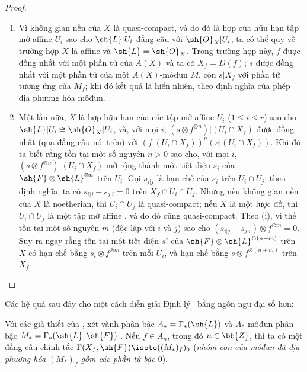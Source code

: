 \documentclass[oneside]{amsart}
\renewcommand{\leq}{\leqslant}
\newcommand{\oldpage}[2][]{{\marginnote{\normalfont\textbf{#1}~|~#2}}\ignorespaces}
\let\EGAOriginalLabel\label
\renewcommand{\label}[1]{\phantomsection\EGAOriginalLabel{#1}}
\begin{document}
\begin{proof}
\medskip\noindent
\begin{enumerate}
  \item[(i)] Vì không gian nền của $X$ là quasi-compact, và do đó là hợp của
    hữu hạn tập mở affine $U_i$ sao cho $\sh{L}|U_i$ đẳng cấu với
    $\sh{O}_X|U_i$, ta có thể quy về trường hợp $X$ là affine và $\sh{L}=\sh{O}_X$.
    Trong trường hợp này, $f$ được đồng nhất với một phần tử của $A(X)$ và ta có
    $X_f=D(f)$; $s$ được đồng nhất với một phần tử của một $A(X)$-môđun $M$, còn
    $s|X_f$ với phần tử tương ứng của $M_f$; khi đó kết quả là hiển nhiên,
    theo định nghĩa của phép địa phương hóa môđun.
\oldpage[I]{173}
  \item[(ii)] Một lần nữa, $X$ là hợp hữu hạn của các tập mở affine $U_i$ ($1\leq i\leq r$)
    sao cho $\sh{L}|U_i\cong\sh{O}_X|U_i$, và, với mọi $i$,
    $(s\otimes f^{\otimes n})|(U_i\cap X_f)$ được đồng nhất (qua đẳng cấu nói trên)
    với $(f|(U_i\cap X_f))^n(s|(U_i\cap X_f))$. Khi đó ta biết
     rằng tồn tại một số nguyên $n>0$ sao cho, với mọi
    $i$, $(s\otimes f^{\otimes n})|(U_i\cap X_f)$ mở rộng thành một tiết diện $s_i$ của
    $\sh{F}\otimes\sh{L}^{\otimes n}$ trên $U_i$. Gọi $s_{i|j}$ là hạn chế
    của $s_i$ trên $U_i\cap U_j$; theo định nghĩa, ta có $s_{i|j}-s_{j|i}=0$ trên
    $X_f\cap U_i\cap U_j$. Nhưng nếu không gian nền của $X$ là noetherian, thì $U_i\cap U_j$ là
    quasi-compact; nếu $X$ là một lược đồ, thì $U_i\cap U_j$ là một tập mở affine
    , và do đó cũng quasi-compact. Theo (i), vì thế
    tồn tại một số nguyên $m$ (độc lập với $i$ và $j$) sao cho
    $(s_{i|j}-s_{j|i})\otimes f^{\otimes m}=0$. Suy ra ngay rằng
    tồn tại một tiết diện $s'$ của $\sh{F}\otimes\sh{L}^{\otimes(n+m)}$ trên $X$ có
    hạn chế bằng $s_i\otimes f^{\otimes m}$ trên mỗi $U_i$, và hạn chế bằng
    $s\otimes f^{\otimes(n+m)}$ trên $X_f$.
\end{enumerate}
\end{proof}

Các hệ quả sau đây cho một cách diễn giải Định lý~ bằng ngôn ngữ
đại số hơn:
\begin{corollary}[9.3.2]
\label{I.9.3.2}
Với các giả thiết của , xét vành phân bậc $A_*=\Gamma_*(\sh{L})$
và $A_*$-môđun phân bậc $M_*=\Gamma_*(\sh{L},\sh{F})$ . Nếu $f\in A_n$,
trong đó $n\in\bb{Z}$, thì ta có một đẳng cấu chính tắc
$\Gamma(X_f,\sh{F})\isoto((M_*)_f)_0$ (\emph{nhóm con của môđun đã địa phương hóa
$(M_*)_f$ gồm các phần tử bậc $0$}).
\end{corollary}
\end{document}
